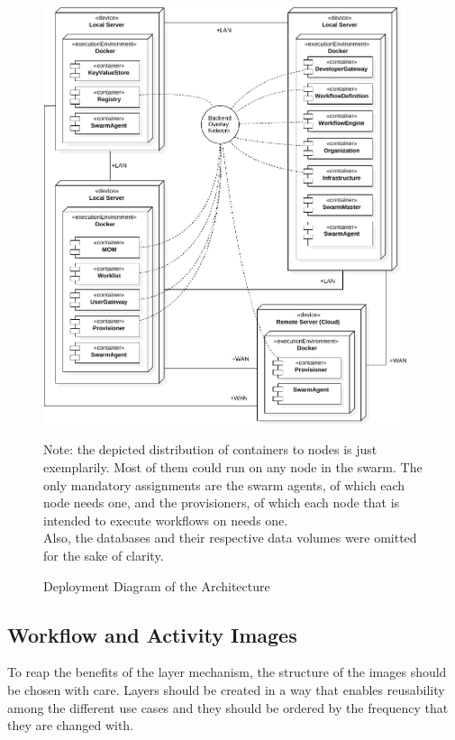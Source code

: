   \begin{figure}[htbp]
    \centering
    \includegraphics[width=0.95\textwidth]{content/images/Architecture-crop.pdf}
    \caption*{\scriptsize Note: the depicted distribution of containers to nodes is just exemplarily. Most of them could run on any node in the swarm. The only mandatory assignments are the swarm agents, of which each node needs one, and the provisioners, of which each node that is intended to execute workflows on needs one. \\ Also, the databases and their respective data volumes were omitted for the sake of clarity.}
    \caption{Deployment Diagram of the Architecture}
    \label{fig:label}
  \end{figure}

\subsection{Workflow and Activity Images} %
\label{sub:workflow_activity_images}
  To reap the benefits of the layer mechanism, the structure of the images should be chosen with care. Layers should be created in a way that enables reusability among the different use cases and they should be ordered by the frequency that they are changed with.

